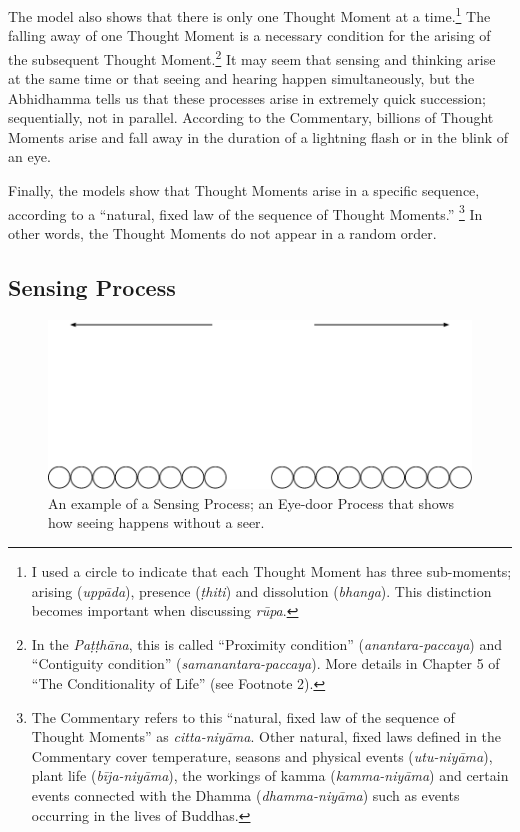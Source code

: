 The model also shows that there is only one Thought Moment at a time.\footnote{I used a circle to indicate that each Thought Moment has three sub-moments; arising (\textit{uppāda}), presence (\textit{ṭhiti}) and dissolution (\textit{bhanga}). This distinction becomes important when discussing \textit{rūpa}.} The falling away of one Thought Moment is a necessary condition for the arising of the subsequent Thought Moment.\footnote{In the \textit{Paṭṭhāna}, this is called “Proximity condition” (\textit{anantara-paccaya}) and “Contiguity condition” (\textit{samanantara-paccaya}). More details in Chapter 5 of “The Conditionality of Life” (see Footnote 2).} It may seem that sensing and thinking arise at the same time or that seeing and hearing happen simultaneously, but the Abhidhamma tells us that these processes arise in extremely quick succession; sequentially, not in parallel. According to the Commentary, billions of Thought Moments arise and fall away in the duration of a lightning flash or in the blink of an eye.

Finally, the models show that Thought Moments arise in a specific sequence, according to a “natural, fixed law of the sequence of Thought Moments.” \footnote{The Commentary refers to this “natural, fixed law of the sequence of Thought Moments” as \textit{citta-niyāma}. Other natural, fixed
laws defined in the Commentary cover temperature, seasons and physical events (\textit{utu-niyāma}), plant life
(\textit{bīja-niyāma}), the workings of kamma (\textit{kamma-niyāma}) and certain events connected with the
Dhamma (\textit{dhamma-niyāma}) such as events occurring in the lives of Buddhas.} In other words, the Thought Moments do not appear in a random order.

\subsection*{Sensing Process}

\begin{figure}[h]
\centering
\includegraphics[width=1\linewidth]{./Diagrams/Process}
\caption{An example of a Sensing Process; an Eye-door Process that shows how seeing happens without a seer.}
\label{fig:Process}
\end{figure}

